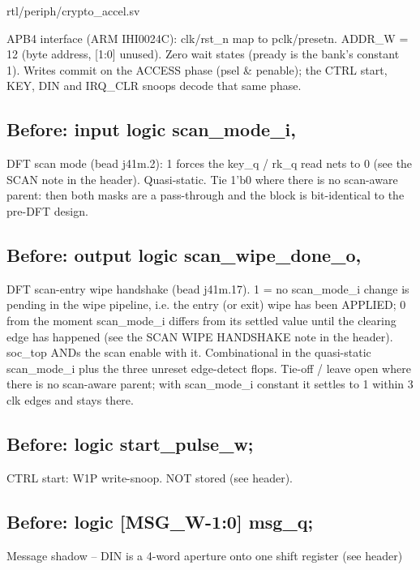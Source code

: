 \begin{relocated}{rtl/periph/crypto_accel.sv}
\begin{textblock}
APB4 interface (ARM IHI0024C): clk/rst_n map to pclk/presetn. ADDR_W = 12 (byte address, [1:0]
unused). Zero wait states (pready is the bank's constant 1). Writes commit on the ACCESS phase
(psel & penable); the CTRL start, KEY, DIN and IRQ_CLR snoops decode that same phase.
\end{textblock}

\subsection*{Before: input  logic scan\_mode\_i,}

\begin{textblock}
DFT scan mode (bead j41m.2): 1 forces the key_q / rk_q read nets to 0 (see the SCAN note in
the header). Quasi-static. Tie 1'b0 where there is no scan-aware parent: then both masks are
a pass-through and the block is bit-identical to the pre-DFT design.
\end{textblock}

\subsection*{Before: output logic scan\_wipe\_done\_o,}

\begin{textblock}
DFT scan-entry wipe handshake (bead j41m.17). 1 = no scan_mode_i change is pending in the
wipe pipeline, i.e. the entry (or exit) wipe has been APPLIED; 0 from the moment scan_mode_i
differs from its settled value until the clearing edge has happened (see the SCAN WIPE
HANDSHAKE note in the header). soc_top ANDs the scan enable with it. Combinational in the
quasi-static scan_mode_i plus the three unreset edge-detect flops. Tie-off / leave open
where there is no scan-aware parent; with scan_mode_i constant it settles to 1 within 3 clk
edges and stays there.
\end{textblock}

\subsection*{Before: logic start\_pulse\_w;}

\begin{textblock}
CTRL start: W1P write-snoop. NOT stored (see header).
\end{textblock}

\subsection*{Before: logic [MSG\_W-1:0] msg\_q;}

\begin{textblock}
Message shadow -- DIN is a 4-word aperture onto one shift register (see header)
\end{textblock}

\end{relocated}

